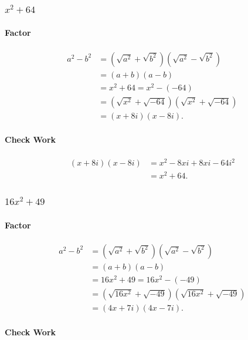 \subsubsection{$x^2 + 64$}

\paragraph{Factor}

\begin{align}
  a^2 - b^2 &= (\sqrt{a^2} + \sqrt{b^2})(\sqrt{a^2} - \sqrt{b^2}) \\
            &= (a + b)(a - b) \\
            &= x^2 + 64 = x^2 - (-64) \\
            &= (\sqrt{x^2} + \sqrt{-64})(\sqrt{x^2} + \sqrt{-64}) \\
            &= \boxed{(x + 8i)(x - 8i)}
.\end{align}

\paragraph{Check Work}

\begin{align}
  (x + 8i)(x - 8i) &= x^2 - 8xi + 8xi - 64i^2 \\
                   &= x^2 + 64
.\end{align}

\subsubsection{$16x^2 + 49$}

\paragraph{Factor}

\begin{align}
  a^2 - b^2 &= (\sqrt{a^2} + \sqrt{b^2})(\sqrt{a^2} - \sqrt{b^2}) \\
            &= (a + b)(a - b) \\
            &= 16x^2 + 49 = 16x^2 - (-49) \\
            &= (\sqrt{16x^2} + \sqrt{-49})(\sqrt{16x^2} + \sqrt{-49}) \\
            &= \boxed{(4x + 7i)(4x - 7i)}
.\end{align}

\paragraph{Check Work}

